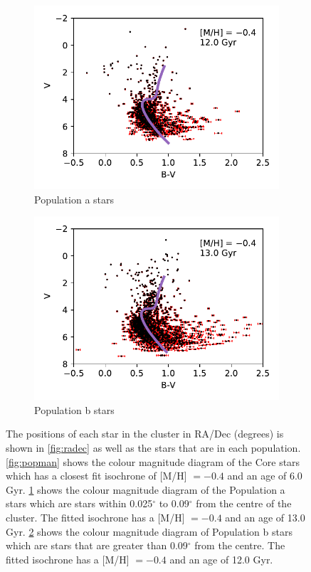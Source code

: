 \documentclass[11pt]{article}
\begin{document}
\begin{figure}[h]
\begin{subfigure}[b]{0.49\textwidth}
		\centering
		\includegraphics[width=\textwidth]{../Figures/pop1}
		\vspace{-7mm}
		\caption{Population a stars}
		\label{fig:pop1}
	\end{subfigure}
	\hfill
	\begin{subfigure}[b]{0.49\textwidth}
		\centering
		\includegraphics[width=\textwidth]{../Figures/pop2}
		\vspace{-7mm}
		\caption{Population b stars}
		\label{fig:pop2}
	\end{subfigure}
	\caption{The positions of each star in the cluster in RA/Dec (degrees) is shown in \ref{fig:radec} as well as the stars that are in each population. \ref{fig:popman} shows the colour magnitude diagram of the Core stars which has a closest fit isochrone of [M/H] $=-0.4$ and an age of 6.0 Gyr. \ref{fig:pop1} shows the colour magnitude diagram of the Population a stars which are stars within 0.025$^{\circ}$ to 0.09$^{\circ}$ from the centre of the cluster. The fitted isochrone has a [M/H] $=-0.4$ and an age of 13.0 Gyr. \ref{fig:pop2} shows the colour magnitude diagram of Population b stars which are stars that are greater than 0.09$^{\circ}$ from the centre. The fitted isochrone has a [M/H] $=-0.4$ and an age of 12.0 Gyr.}
	\label{fig:populations}
\end{figure}
\end{document}
